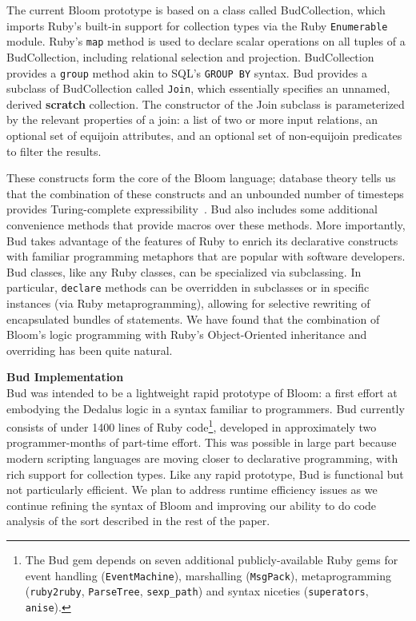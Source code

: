 The current Bloom prototype is based on a class called BudCollection, which imports Ruby's built-in support for collection types via the Ruby {\tt Enumerable} module.  Ruby's {\tt map} method is used to declare scalar operations on all tuples of a BudCollection, including relational selection and projection.      BudCollection provides a {\tt group} method akin to SQL's {\tt GROUP BY} syntax.         Bud provides a subclass of BudCollection called {\tt Join}, which essentially specifies an unnamed, derived {\bf scratch} collection.  The constructor of the Join subclass is parameterized by the relevant properties of a join: a list of two or more input relations, an optional set of equijoin attributes, and an optional set of non-equijoin predicates to filter the results.  

These constructs form the core of the Bloom language; database theory tells us that the combination of these constructs and an unbounded number of timesteps provides Turing-complete expressibility~\cite{christospaper}.  Bud also includes some additional convenience methods that provide macros over these methods.  More importantly, Bud takes advantage of the features of Ruby to enrich its declarative constructs with familiar programming metaphors that are popular with software developers.  Bud classes, like any Ruby classes, can be specialized via subclassing.  In particular, {\tt declare} methods can be overridden in subclasses or in specific instances (via Ruby metaprogramming), allowing for selective rewriting of encapsulated bundles of statements.  We have found that the combination of Bloom's logic programming with Ruby's Object-Oriented inheritance and overriding has been quite natural.

{\bf Bud Implementation}\\
Bud was intended to be a lightweight rapid prototype of Bloom: a first effort at embodying the Dedalus logic in a syntax familiar to programmers.  Bud currently consists of under 1400 lines of Ruby code\footnote{The Bud gem depends on seven additional publicly-available Ruby gems for event handling ({\tt EventMachine}), marshalling ({\tt MsgPack}), metaprogramming ({\tt ruby2ruby}, {\tt ParseTree}, {\tt sexp\_path}) and syntax niceties ({\tt superators}, {\tt anise}).}, developed in approximately two programmer-months of part-time effort.  This was possible in large part because modern scripting languages are moving closer to declarative programming, with rich support for collection types.  Like any rapid prototype, Bud is functional but not particularly efficient.  We plan to address runtime efficiency issues as we continue refining the syntax of Bloom and improving our ability to do code analysis of the sort described in the rest of the paper.

